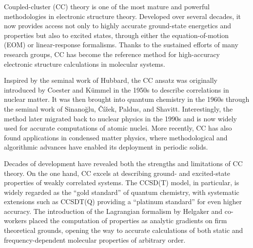 \documentclass[aip,jcp,reprint,noshowkeys,superscriptaddress]{revtex4-2}
\begin{document}
Coupled-cluster (CC) theory is one of the most mature and powerful methodologies in electronic structure theory.\cite{Crawford_2000,Piecuch_2002,Bartlett_2007,Shavitt_2009,Bartlett_2024} 
Developed over several decades, it now provides access not only to highly accurate ground-state energetics and properties but also to excited states, through either the equation-of-motion (EOM) or linear-response formalisms. \cite{Rowe_1968a,Koch_1990a,Stanton_1993a,Koch_1994,Sneskov_2012} 
Thanks to the sustained efforts of many research groups, CC has become the reference method for high-accuracy electronic structure calculations in molecular systems. \cite{Tajti_2004,Bomble_2006,Harding_2008,Karton_2006,Karton_2017,Goerigk_2011a,Goerigk_2011b,Goerigk_2017,Loos_2020d,Veril_2021,Loos_2025}

Inspired by the seminal work of Hubbard, \cite{Hubbard_1957} the CC ansatz was originally introduced by Coester and Kümmel in the 1950s to describe correlations in nuclear matter. \cite{Coester_1958,Coester_1960} 
It was then brought into quantum chemistry in the 1960s through the seminal work of Sinanoğlu, Čížek, Paldus, and Shavitt. \cite{Sinanoglu_1962,Cizek_1966,Paldus_1972} 
Interestingly, the method later migrated back to nuclear physics in the 1990s \cite{Bishop_1991} and is now widely used for accurate computations of atomic nuclei. \cite{Dean_2004,Kowalski_2004,Hagen_2014} 
More recently, CC has also found applications in condensed matter physics, where methodological and algorithmic advances have enabled its deployment in periodic solids. \cite{Gruber_2018,Zhang_2019a,Wang_2020,Neufel_2023,Masios_2023,Ye_2024,Vo_2024,Moerman_2025a,Moerman_2025b}

Decades of development have revealed both the strengths and limitations of CC theory. 
On the one hand, CC excels at describing ground- and excited-state properties of weakly correlated systems. 
The CCSD(T) model, in particular, is widely regarded as the ``gold standard'' of quantum chemistry, \cite{Purvis_1982,Raghavachari_1989} with systematic extensions such as CCSDT(Q) \cite{Bomble_2005} providing a ``platinum standard'' for even higher accuracy. \cite{Kodrycka_2019}
The introduction of the Lagrangian formalism by Helgaker and co-workers placed the computation of properties as analytic gradients on firm theoretical grounds, opening the way to accurate calculations of both static and frequency-dependent molecular properties of arbitrary order. \cite{Helgaker_1988,Koch_1990b,Koch_1990c,Helgaker_1992,Gauss_2000,Helgakerbook,Hampe_2019} 
\end{document}
